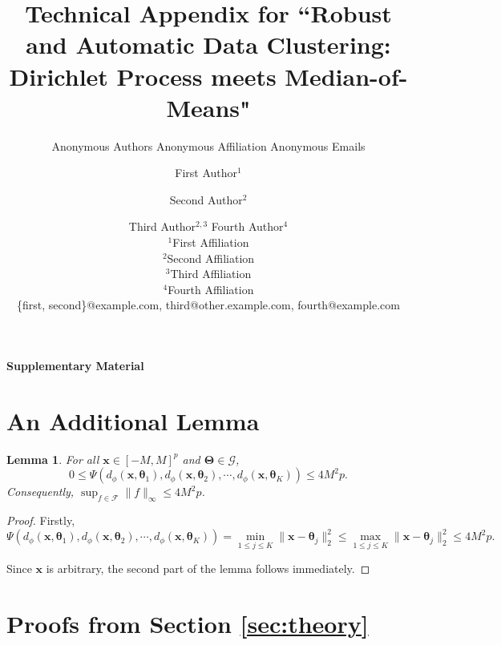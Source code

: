 \documentclass{article}
\title{Technical Appendix for ``Robust and Automatic Data Clustering: Dirichlet Process meets Median-of-Means"}
\author{
    Anonymous Authors
    \affiliations
    Anonymous Affiliation
    \emails
    Anonymous Emails
}
\author{
First Author$^1$
\and
Second Author$^2$\and
Third Author$^{2,3}$\And
Fourth Author$^4$\\
\affiliations
$^1$First Affiliation\\
$^2$Second Affiliation\\
$^3$Third Affiliation\\
$^4$Fourth Affiliation\\
\emails
\{first, second\}@example.com,
third@other.example.com,
fourth@example.com
}
\newtheorem{lemma}{Lemma}[section]
\begin{document}
\onecolumn
\appendix

\begin{center}
    \LARGE{\bfseries Supplementary Material}
\end{center}
\vspace{1cm}


\section{An Additional Lemma}

\begin{lemma}\label{lemma-bound-Psi}
    For all $\bm{x}\in [-M,M]^p$ and $\bm{\Theta}\in \mathscr{G}$, \[0\le \Psi(d_{\phi}(\bm{x},\bm{\theta}_1), d_{\phi}(\bm{x},\bm{\theta}_2),\cdots, d_{\phi}(\bm{x},\bm{\theta}_K) )\le 4M^2p.\]
    Consequently, $\sup_{f\in \mathcal{F}}\|f\|_{\infty}\le 4M^2p$.
\end{lemma}

\begin{proof}
    Firstly,
    \begin{equation*}
        \Psi(d_{\phi}(\bm{x},\bm{\theta}_1), d_{\phi}(\bm{x},\bm{\theta}_2),\cdots, d_{\phi}(\bm{x},\bm{\theta}_K) ) = \min_{1\le j\le K}\|\bm{x}-\bm{\theta}_j\|_2^2 \le \max_{1\le j\le K}\|\bm{x}-\bm{\theta}_j\|_2^2 \le 4M^2p.
    \end{equation*}

    Since $\bm{x}$ is arbitrary, the second part of the lemma follows immediately.
\end{proof}

\section{Proofs from Section \ref{sec:theory}}
\end{document}
